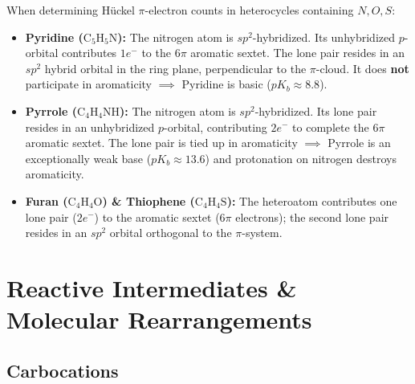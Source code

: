 \documentclass[10pt,a4paper]{article}
\begin{document}
\begin{usecasebox}
When determining Hückel $\pi$-electron counts in heterocycles containing $N, O, S$:
\begin{itemize}
  \item \textbf{Pyridine ($\mathrm{C_5H_5N}$):} The nitrogen atom is $sp^2$-hybridized. Its unhybridized $p$-orbital contributes $1e^-$ to the $6\pi$ aromatic sextet. The lone pair resides in an $sp^2$ hybrid orbital in the ring plane, perpendicular to the $\pi$-cloud. It does \textbf{not} participate in aromaticity $\implies$ Pyridine is basic ($pK_b \approx 8.8$).
  \item \textbf{Pyrrole ($\mathrm{C_4H_4NH}$):} The nitrogen atom is $sp^2$-hybridized. Its lone pair resides in an unhybridized $p$-orbital, contributing $2e^-$ to complete the $6\pi$ aromatic sextet. The lone pair is tied up in aromaticity $\implies$ Pyrrole is an exceptionally weak base ($pK_b \approx 13.6$) and protonation on nitrogen destroys aromaticity.
  \item \textbf{Furan ($\mathrm{C_4H_4O}$) \& Thiophene ($\mathrm{C_4H_4S}$):} The heteroatom contributes one lone pair ($2e^-$) to the aromatic sextet ($6\pi$ electrons); the second lone pair resides in an $sp^2$ orbital orthogonal to the $\pi$-system.
\end{itemize}
\end{usecasebox}

\section{Reactive Intermediates \& Molecular Rearrangements}

\subsection{Carbocations}
\end{document}
